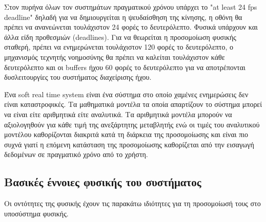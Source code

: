 Στον πυρήνα όλων τον συστημάτων πραγματικού χρόνου υπάρχει το "at least 24 fps deadline" δηλαδή για να δημιουργείται η ψευδαίσθηση της κίνησης, η οθόνη θα πρέπει να ανανεώνεται τουλάχιστον 24 φορές το δευτερόλεπτο. Φυσικά υπάρχουν και άλλα είδη προθεσμιών (deadlines). Για να θεωρείται η προσομοίωση φυσικής σταθερή, πρέπει να ενημερώνεται τουλάχιστον 120 φορές το δευτερόλεπτο, ο μηχανισμός τεχνητής νοημοσύνης θα πρέπει να καλείται τουλάχιστον κάθε δευτερόλεπτο και οι buffers ήχου 60 φορές το δευτερόλεπτο για να αποτρέπονται δυσλειτουργίες του συστήματος διαχείρισης ήχου.

Ένα soft real time system είναι ένα σύστημα στο οποίο χαμένες ενημερώσεις δεν είναι καταστροφικές.
Τα μαθηματικά μοντέλα τα οποία απαρτίζουν το σύστημα μπορεί να είναι είτε αριθμητικά είτε αναλυτικά. Τα αριθμητικά μοντέλα μπορούν να αξιολογηθούν για κάθε τιμή της ανεξάρτητης μεταβλητής ενώ οι τιμές του αναλυτικού μοντέλου καθορίζονται διακριτά κατά τη διάρκεια της προσομοίωσης και είναι πιο συχνά γιατί η επόμενη κατάσταση της προσομοίωσης καθορίζεται από την εισαγωγή δεδομένων σε πραγματικό χρόνο από το χρήστη. \cite{realtime_collision04}

\subsection{Βασικές έννοιες φυσικής του συστήματος}
Οι οντότητες της φυσικής έχουν τις παρακάτω ιδιότητες για τη προσομοίωσή τους στο υποσύστημα φυσικής.

